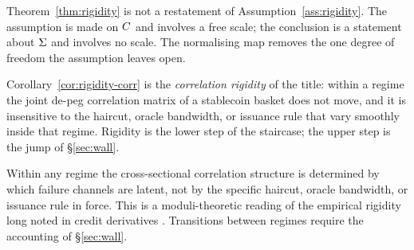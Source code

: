 \begin{corollary}\label{cor:rigidity-corr}
Theorem~\ref{thm:rigidity} is not a restatement of Assumption~\ref{ass:rigidity}. The assumption is made on $C$ and involves a free scale; the conclusion is a statement about $\Sigma$ and involves no scale. The normalising map removes the one degree of freedom the assumption leaves open.
\end{corollary}

Corollary~\ref{cor:rigidity-corr} is the \emph{correlation rigidity} of the title: within a regime the joint de-peg correlation matrix of a stablecoin basket does not move, and it is insensitive to the haircut, oracle bandwidth, or issuance rule that vary smoothly inside that regime. Rigidity is the lower step of the staircase; the upper step is the jump of \S\ref{sec:wall}.

\begin{remark}\label{rem:economic}
Within any regime the cross-sectional correlation structure is determined by which failure channels are latent, not by the specific haircut, oracle bandwidth, or issuance rule in force. This is a moduli-theoretic reading of the empirical rigidity long noted in credit derivatives \citep{CovalJurekStafford2009}. Transitions between regimes require the accounting of \S\ref{sec:wall}.
\end{remark}
